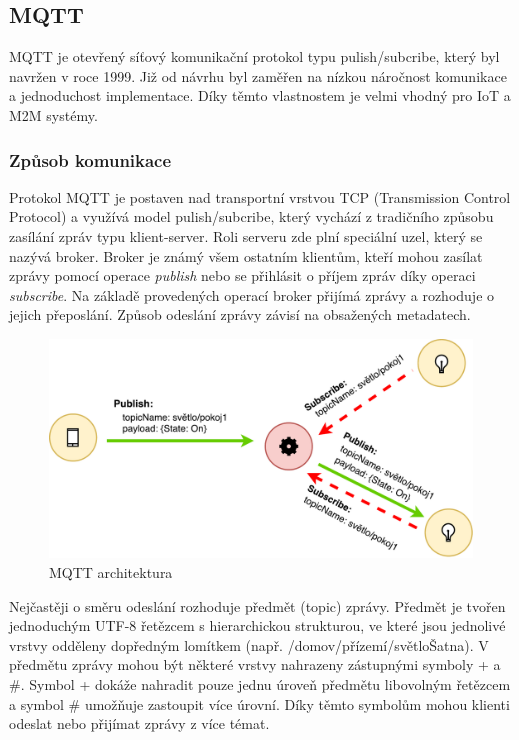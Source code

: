 \subsection{MQTT}
  MQTT je otevřený síťový komunikační protokol typu pulish/subcribe, který byl navržen
  v roce 1999. Již od návrhu byl zaměřen na nízkou náročnost komunikace a jednoduchost
  implementace. Díky těmto vlastnostem je velmi vhodný pro IoT a M2M systémy. \cite{mqtt}
  \subsubsection{Způsob komunikace}
  
  Protokol MQTT je postaven nad transportní vrstvou TCP (Transmission Control Protocol)
  a využívá model pulish/subcribe, který vychází z tradičního způsobu zasílání zpráv
  typu klient-server. Roli serveru zde plní speciální uzel, který se nazývá broker.
  Broker je známý všem ostatním klientům, kteří mohou zasílat zprávy pomocí operace
  \textit{publish} nebo se přihlásit o příjem zpráv díky operaci \textit{subscribe}.
  Na základě provedených operací broker přijímá zprávy a rozhoduje o jejich přeposlání.
  Způsob odeslání zprávy závisí na obsažených metadatech.
  
\begin{figure}[ht]
\begin{center}
\includegraphics[scale=0.41]{pictures/mqtt-arch}
\caption{MQTT architektura}
\label{obr.mqtt-arch}
\end{center}
\end{figure}
  
  Nejčastěji o směru odeslání rozhoduje předmět (topic) zprávy. Předmět je tvořen
  jednoduchým UTF-8 řetězcem s hierarchickou strukturou, ve které jsou jednolivé
  vrstvy odděleny dopředným lomítkem (např. /domov/přízemí/světloŠatna). V předmětu
  zprávy mohou být některé vrstvy nahrazeny zástupnými symboly + a \#. Symbol + dokáže
  nahradit pouze jednu úroveň předmětu libovolným řetězcem a symbol \# umožňuje
  zastoupit více úrovní. Díky těmto symbolům mohou klienti odeslat nebo přijímat
  zprávy z více témat.
  
